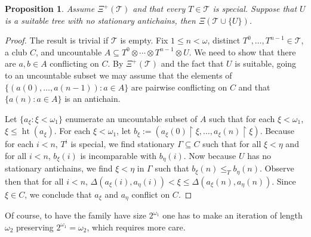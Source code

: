 \documentclass[10pt,a4paper]{amsart}
\newtheorem{proposition}[theorem]{Proposition}
\theoremstyle{definition}
\newcommand{\seb}{\subseteq}
\newcommand{\res}{\!\upharpoonright\!}
\newcommand{\1}{\mathbf{1}}
\newcommand{\T}{\mathcal{T}}
\newcommand{\prop}{\Xi}
\newcommand{\propp}{\prop^{+}}
\DeclareMathOperator{\hht}{ht}
\begin{document}
\begin{proposition}
  Assume $\propp(\T)$ and that every $T \in \T$ is special.
  Suppose that $U$ is
  a suitable tree with no stationary antichains, then $\prop(\T \cup \{U\})$.
\end{proposition}
\begin{proof}
  The result is trivial if $\T$ is empty. Fix $1 \le n < \omega$,
  distinct $T^{0},\dots,T^{n-1} \in \T$, a club $C$,
  and uncountable
  $A \seb T^{0}\otimes \cdots \otimes T^{n-1} \otimes U$. We need to
  show that there are $a,b \in A$ conflicting on $C$.
  By $\propp(\T)$ and the fact that $U$ is suitable, going to an uncountable
  subset we may assume that the elements of $\{(a(0),\dots,a(n-1)) : a \in A\}$
  are pairwise conflicting on $C$ and that $\{a(n) : a \in A\}$ is an antichain.

  Let $\{a_{\xi} : \xi < \omega_{1}\}$
  enumerate an uncountable subset of $A$ such that
  for each $\xi < \omega_{1}$, $\xi \le \hht(a_{\xi})$.
  For each $\xi < \omega_{1}$, let $b_{\xi} := (a_{\xi}(0)\res \xi,\dots,
  a_{\xi}(n)\res \xi)$. Because for each $i < n$, $T^{i}$ is special,
  we find stationary $\Gamma \seb C$ such that for all
  $\xi < \eta$ and for all $i < n$, $b_{\xi}(i)$ is incomparable
  with $b_{\eta}(i)$. Now because $U$ has no stationary antichains,
  we find $\xi < \eta$ in $\Gamma$ such that
  $b_{\xi}(n) \le_{T} b_{\eta}(n)$. Observe then
  that for all $i < n$,
  $\Delta(a_{\xi}(i),a_{\eta}(i)) < \xi \le \Delta(a_{\xi}(n),a_{\eta}(n))$.
  Since $\xi \in C$, we conclude that $a_{\xi}$ and $a_{\eta}$ conflict on $C$.
\end{proof}

Of course, to have the family have size $2^{\omega_{1}}$ one has to make
an iteration of length $\omega_{2}$ preserving $2^{\omega_{1}} = \omega_{2}$,
which requires more care.
\end{document}
